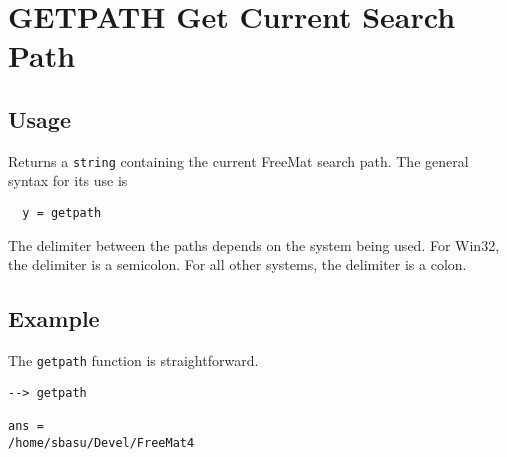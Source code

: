 \section{GETPATH Get Current Search Path}

\subsection{Usage}

Returns a \verb|string| containing the current FreeMat search path.  The general syntax for
its use is
\begin{verbatim}
  y = getpath
\end{verbatim}
The delimiter between the paths depends on the system being used.  For Win32, the
delimiter is a semicolon.  For all other systems, the delimiter is a colon.

\subsection{Example}

The \verb|getpath| function is straightforward.
\begin{verbatim}
--> getpath

ans = 
/home/sbasu/Devel/FreeMat4
\end{verbatim}
